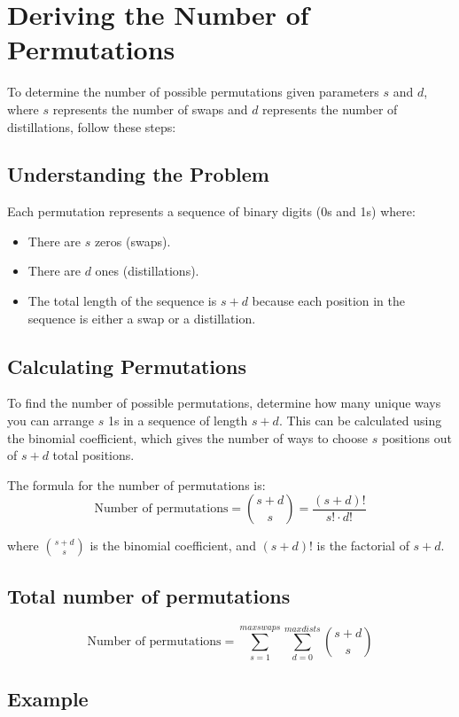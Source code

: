 \documentclass{article}
\begin{document}
\section*{Deriving the Number of Permutations}

To determine the number of possible permutations given parameters \(s\) and \(d\), where \(s\) represents the number of swaps and \(d\) represents the number of distillations, follow these steps:

\subsection*{Understanding the Problem}

Each permutation represents a sequence of binary digits (0s and 1s) where:
\begin{itemize}
    \item There are \(s\) zeros (swaps).
    \item There are \(d\) ones (distillations).
    \item The total length of the sequence is \(s + d\) because each position in the sequence is either a swap or a distillation.
\end{itemize}

\subsection*{Calculating Permutations}

To find the number of possible permutations, determine how many unique ways you can arrange \(s\) 1s in a sequence of length \(s + d\). This can be calculated using the binomial coefficient, which gives the number of ways to choose \(s\) positions out of \(s + d\) total positions.

The formula for the number of permutations is:
\[
\text{Number of permutations} = \binom{s+d}{s} = \frac{(s+d)!}{s! \cdot d!}
\]

where \(\binom{s+d}{s}\) is the binomial coefficient, and \((s+d)!\) is the factorial of \(s + d\).

\subsection*{Total number of permutations}

\[
\text{Number of permutations} = \sum_{s=1}^{max swaps} \sum_{d=0}^{max dists} \binom{s+d}{s}
\]


\subsection*{Example}
\end{document}
